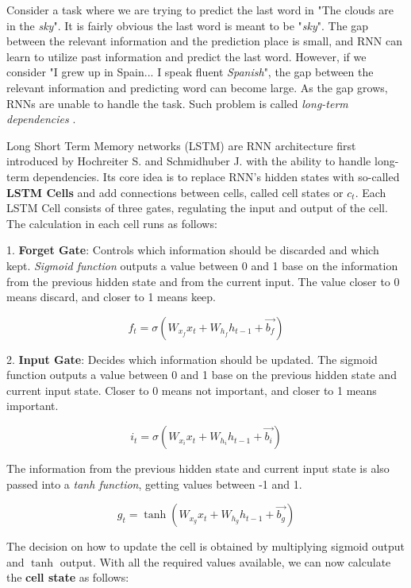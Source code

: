 Consider a task where we are trying to predict the last word in "The clouds are in the \textit{sky}". It is fairly obvious the last word is meant to be "\textit{sky}". The gap between the relevant information and the prediction place is small, and RNN can learn to utilize past information and predict the last word. However, if we consider "I grew up in Spain... I speak fluent \textit{Spanish}", the gap between the relevant information and predicting word can become large. As the gap grows, RNNs are unable to handle the task. Such problem is called \textit{long-term dependencies} \cite{colahLSTM}.

Long Short Term Memory networks (LSTM) are RNN architecture first introduced by Hochreiter S. and Schmidhuber J. \cite{hochreiterLSTM} with the ability to handle long-term dependencies. Its core idea is to replace RNN's hidden states with so-called \textbf{LSTM Cells} and add connections between cells, called cell states or $c_{t}$. Each LSTM Cell consists of three gates, regulating the input and output of the cell. The calculation in each cell runs as follows:

1. \textbf{Forget Gate}: Controls which information should be discarded and which kept. \textit{Sigmoid function} outputs a value between 0 and 1 base on the information from the previous hidden state and from the current input. The value closer to 0 means discard, and closer to 1 means keep.

\begin{equation}
    {f_t = \sigma(W_{x_f}x_t + W_{h_f}h_{t-1}+\vec{b_f})}
\end{equation}

2. \textbf{Input Gate}: Decides which information should be updated. The sigmoid function outputs a value between 0 and 1 base on the previous hidden state and current input state. Closer to 0 means not important, and closer to 1 means important.

\begin{equation}
    {i_t = \sigma(W_{x_i}x_t + W_{h_i}h_{t-1}+\vec{b_i})}
\end{equation}

The information from the previous hidden state and current input state is also passed into a \textit{tanh function}, getting values between -1 and 1.

\begin{equation}
    {g_t = \tanh(W_{x_g}x_t + W_{h_g}h_{t-1}+\vec{b_g})}
\end{equation}

The decision on how to update the cell is obtained by multiplying sigmoid output and $\tanh$ output. With all the required values available, we can now calculate the \textbf{cell state} as follows:

